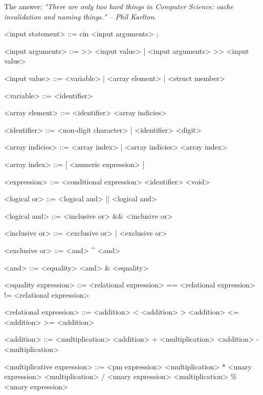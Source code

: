 \documentclass{article}
\begin{document}
		The answer:
		\newline
		\newline
		\textit{"There are only two hard things in Computer Science: cache invalidation and naming things." -- Phil Karlton.\\}
		
	\ttfamily
	
	
	
	\begin{grammar}
	
		<input statement> ::= cin <input arguments> ;
		
		<input arguments> ::= >> <input value> | <input arguments> >> <input value>
		
		<input value> ::= <variable> | <array element> | <struct member>
		
		<variable> ::= <identifier>
		
		<array element> ::= <identifier> <array indicies>
		
		<identifier> ::= <non-digit character> | <identifier> <digit>
		
		<array indicies> ::= <array index> | <array indicies> <array index>
		
		<array index> ::= [ <numeric expression> ]
		
		<expression> ::= <conditional expression>
					\alt <numeric expression>
					\alt <function call>
					\alt <identifier>
					\alt <void>
		
		
		
<logical or> ::= <logical and>
			\alt <logical or> || <logical and>

<logical and> ::= <inclusive or>
			 \alt <logical and> \&\& <inclusive or>

<inclusive or> ::= <exclusive or>
			  \alt <inclusive or> | <exclusive or>

<exclusive or> ::= <and>
			  \alt <exclusive or> \^{} <and>

<and> ::= <equality>
	 \alt <and> \& <equality>

<equality expression> ::= <relational expression>
		  \alt <equality expression> == <relational expression>
		  \alt <equality expression> != <relational expression>

<relational expression>	::= <addition>
					   \alt <relational expression> < <addition>
					   \alt <relational expression> > <addition>
					   \alt <relational expression> <= <addition>
					   \alt <relational expression> >= <addition>

<addition> ::= <multiplication>
				  \alt <addition> + <multiplication>
				  \alt <addition> - <multiplication>

<multiplicative expression>	::= <pm expression>
						    <unary expression>
						   \alt <multiplication> / <unary expression>
						   \alt <multiplication> \% <unary expression>
						   

		
		
		
	\end{grammar}
\end{document}
